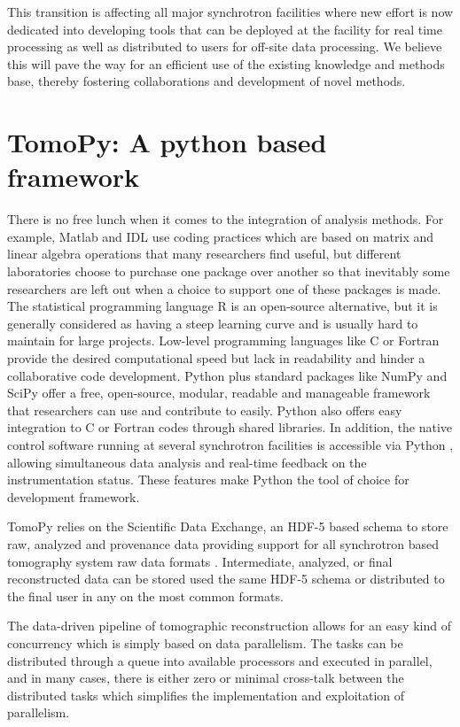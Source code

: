 \documentclass[pdf]{iucr}              %
\begin{document}
This transition is affecting all major synchrotron facilities where new effort is now dedicated into developing tools that can be deployed at the facility for real time processing as well as distributed to users for off-site data processing. We believe this will pave the way for an efficient use of the existing knowledge and methods base, thereby fostering collaborations and development of novel methods.

\section{TomoPy: A python based framework}

There is no free lunch when it comes to the integration of analysis methods. For example, Matlab and IDL use coding practices which are based on matrix and linear algebra operations that many researchers find useful, but different laboratories choose to purchase one package over another so that inevitably some researchers are left out when a choice to support one of these packages is made.
The statistical programming language R \cite{r} is an open-source alternative, but it is generally considered as having a steep learning curve and is usually hard to maintain for large projects. Low-level programming languages like C or Fortran provide the desired computational speed but lack in readability and hinder a collaborative code development.  Python plus standard packages like NumPy and SciPy offer a free, open-source, modular, readable and manageable framework that researchers can use and contribute to easily.  Python also offers easy integration to C or Fortran codes through shared libraries.  In addition, the native  control software running at several synchrotron facilities \cite{epics} is accessible via Python \cite{pyepics}, allowing simultaneous data analysis and real-time feedback on the instrumentation status. These features make Python the tool of choice for development framework.

TomoPy relies on the Scientific Data Exchange, an HDF-5 based schema to store raw, analyzed and provenance data providing support for all synchrotron based tomography system raw data formats \cite{data_exchange}. Intermediate, analyzed, or final reconstructed data can be stored used the same HDF-5 schema or distributed to the final user in any on the most common formats. 

The data-driven pipeline of tomographic reconstruction allows for an easy kind of concurrency which is simply based on data parallelism. The tasks can be distributed through a queue into available processors and executed in parallel, and in many cases, there is either zero or minimal cross-talk between the distributed tasks which simplifies the implementation and exploitation of parallelism.
\end{document}
